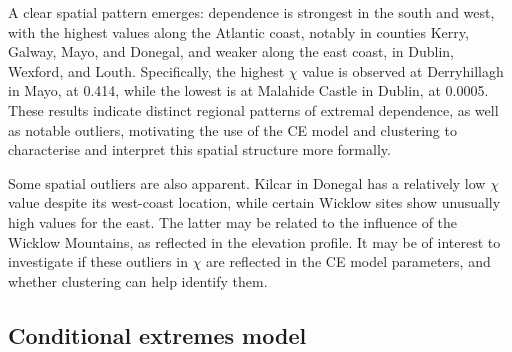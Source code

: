 \documentclass[
  12pt]{article}
\begin{document}
A clear spatial pattern emerges: dependence is strongest in the south and west, with the highest values along the Atlantic coast, notably in counties Kerry, Galway, Mayo, and Donegal, and weaker along the east coast, in Dublin, Wexford, and Louth. 
Specifically, the highest $\chi$ value is observed at Derryhillagh in Mayo, at 0.414, while the lowest is at Malahide Castle in Dublin, at 0.0005.
These results indicate distinct regional patterns of extremal dependence, as well as notable outliers, motivating the use of the CE model and clustering to characterise and interpret this spatial structure more formally. 

Some spatial outliers are also apparent. 
Kilcar in Donegal has a relatively low $\chi$ value despite its west-coast location, while certain Wicklow sites show unusually high values for the east. 
The latter may be related to the influence of the Wicklow Mountains, as reflected in the elevation profile. 
It may be of interest to investigate if these outliers in $\chi$ are reflected in the CE model parameters, and whether clustering can help identify them.

\subsection{Conditional extremes model}~\label{subsec:app_ce}
\end{document}

